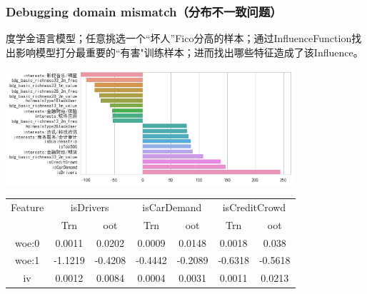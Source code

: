 \documentclass[UTF8]{beamer}
\begin{document}
\begin{frame}
\frametitle{Debugging domain mismatch（分布不一致问题）}
度学金语言模型；任意挑选一个“坏人”Fico分高的样本；通过InfluenceFunction找出影响模型打分最重要的“有害"训练样本；进而找出哪些特征造成了该Influence。
\begin{center}
\includegraphics[width=0.8\textwidth]{gradInf.png}
\end{center}
\begin{center}
\tiny
\begin{tabular}{ | c | c | c | c | c | c | c |}
\hline
Feature & \multicolumn{2}{c|}{isDrivers} & \multicolumn{2}{c|}{isCarDemand} & \multicolumn{2}{c|}{isCreditCrowd} \\
{} & Trn & oot & Trn & oot &  Trn & oot \\ \hline
woe:0 & 0.0011 & {\color{red}0.0202} & 0.0009 & {\color{red}0.0148} & 0.0018 & {\color{red}0.038} \\ \hline
woe:1 & -1.1219 & -0.4208 & -0.4442 & -0.2089 & -0.6318 & -0.5618 \\ \hline 
iv & 0.0012 & 0.0084 & 0.0004 & 0.0031 & 0.0011 & 0.0213 \\ \hline
\end{tabular}
\end{center}
\end{frame}
\end{document}
